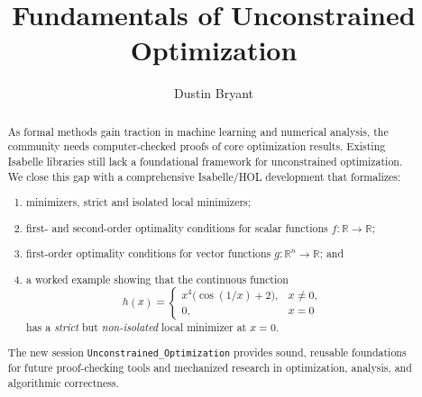 \documentclass[11pt,a4paper]{article}
\begin{document}
\title{Fundamentals of Unconstrained Optimization}
\author{Dustin Bryant}
\maketitle

\begin{abstract}
As formal methods gain traction in machine learning and numerical analysis,
the community needs computer-checked proofs of core optimization results.
Existing Isabelle libraries still lack a foundational framework for
unconstrained optimization.  
We close this gap with a comprehensive Isabelle/HOL development that formalizes:

\begin{enumerate}[label=(\arabic*), leftmargin=*] %
  \item minimizers, strict and isolated local minimizers;
  \item first- and second-order optimality conditions for scalar functions
        \(f : \mathbb{R} \to \mathbb{R}\);
  \item first-order optimality conditions for vector functions
        \(g : \mathbb{R}^{n} \to \mathbb{R}\); and
  \item a worked example showing that the continuous function
        \[
          h(x)=
          \begin{cases}
            x^{4}\bigl(\cos(1/x)+2\bigr), & x \neq 0,\\[4pt]
            0, & x = 0
          \end{cases}
        \]
        has a \emph{strict} but \emph{non-isolated} local minimizer at \(x = 0\).
\end{enumerate}
The new session \texttt{Unconstrained\_Optimization} provides sound,
reusable foundations for future proof-checking tools and mechanized research
in optimization, analysis, and algorithmic correctness.
\end{abstract}



\tableofcontents



\nocite{*}



\end{document}
